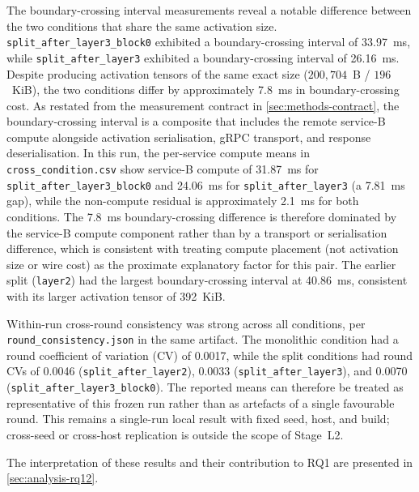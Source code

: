 The boundary-crossing interval measurements reveal a notable difference between
the two conditions that share the same activation size.
\texttt{split\_after\_layer3\_block0} exhibited a boundary-crossing interval of
33.97~ms, while \texttt{split\_after\_layer3} exhibited a boundary-crossing
interval of 26.16~ms. Despite producing activation tensors of the same exact
size ($200{,}704$~B / $196$~KiB), the two conditions differ by approximately
7.8~ms in boundary-crossing cost. As restated from the measurement contract in
\cref{sec:methods-contract}, the boundary-crossing interval is a composite that
includes the remote service-B compute alongside activation serialisation, gRPC
transport, and response deserialisation. In this run, the per-service compute
means in \texttt{cross\_condition.csv} show service-B compute of 31.87~ms for
\texttt{split\_after\_layer3\_block0} and 24.06~ms for \texttt{split\_after\_layer3}
(a 7.81~ms gap), while the non-compute residual is approximately 2.1~ms for both
conditions. The 7.8~ms boundary-crossing difference is therefore dominated by
the service-B compute component rather than by a transport or serialisation
difference, which is consistent with treating compute placement (not activation
size or wire cost) as the proximate explanatory factor for this pair.
The earlier split (\texttt{layer2}) had the largest boundary-crossing interval
at 40.86~ms, consistent with its larger activation tensor of 392~KiB.

Within-run cross-round consistency was strong across all conditions, per
\texttt{round\_consistency.json} in the same artifact. The monolithic condition
had a round coefficient of variation (CV) of 0.0017, while the split conditions
had round CVs of 0.0046 (\texttt{split\_after\_layer2}), 0.0033
(\texttt{split\_after\_layer3}), and 0.0070
(\texttt{split\_after\_layer3\_block0}). The reported means can therefore be
treated as representative of this frozen run rather than as artefacts of a
single favourable round. This remains a single-run local result with fixed
seed, host, and build; cross-seed or cross-host replication is outside the
scope of Stage~L2.

The interpretation of these results and their contribution to RQ1 are presented in
\cref{sec:analysis-rq12}.
